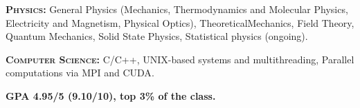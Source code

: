 \begin{cventries}
{\begin{cvitems}
        \item {\textsc{\textbf{Physics:}} General Physics (Mechanics, \hspace{5pt} Thermodynamics and Molecular Physics, \hspace{5pt} Electricity and Magnetism, \hspace{5pt} Physical Optics), \hspace{5pt} Theoretical\hspace{2pt}Mechanics, \hspace{5pt} Field Theory, \hspace{10pt} \textsf{Quantum Mechanics}, \hspace{10pt} \textsf{Solid State Physics}, \hspace{10pt} \textsf{Statistical physics (ongoing)}.}
        \item {\textsc{\textbf{Computer Science:}} \hspace{5pt}  C/C++, \hspace{5pt} UNIX-based systems and multithreading, \hspace{5pt} Parallel computations via \textsf{MPI and CUDA}.}
		\item {\textbf{GPA 4.95/5 (9.10/10), top 3\% of the class.}}        
      \end{cvitems}
    }

\end{cventries}
